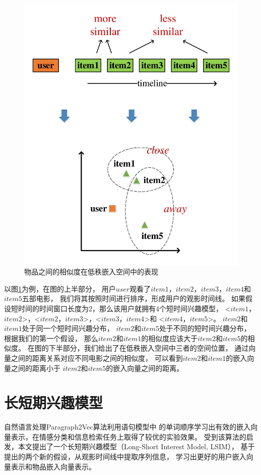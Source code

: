 \begin{figure}[htbp]
\centering
\includegraphics[scale=0.5]{images/embedding.pdf}
\caption{物品之间的相似度在低秩嵌入空间中的表现}
\label{fig:embedding}
\end{figure}

以图\ref{fig:embedding}为例，在图的上半部分，
用户$user$观看了$item1$，$item2$，$item3$，$item4$和$item5$五部电影，
我们将其按照时间进行排序，形成用户的观影时间线。
如果假设短时间的时间窗口长度为$2$，那么该用户就拥有$4$个短时间兴趣模型，
<$item1$，$item2$>，<$item2$，$item3$>，<$item3$，$item4$>和
<$item4$，$item5$>。
$item2$和$item1$处于同一个短时间兴趣分布，
$item2$和$item5$处于不同的短时间兴趣分布，
根据我们的第一个假设，
那么$item2$和$item1$的相似度应该大于$item2$和$item5$的相似度。
在图的下半部分，我们给出了在低秩嵌入空间中三者的空间位置，
通过向量之间的距离关系对应不同电影之间的相似度，
可以看到$item2$和$item1$的嵌入向量之间的距离小于
$item2$和$item5$的嵌入向量之间的距离。

\section{长短期兴趣模型}
自然语言处理Paragraph2Vec算法\parencite{le2014distributed}利用语句模型中
的单词顺序学习出有效的嵌入向量表示，在情感分类和信息检索任务上取得了较优的实验效果。
受到该算法的启发，本文提出了一个长短期兴趣模型（Long-Short Interest Model, LSIM），
基于提出的两个新的假设，从观影时间线中提取序列信息，
学习出更好的用户嵌入向量表示和物品嵌入向量表示。

